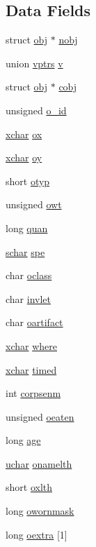 \subsection*{Data Fields}
\begin{DoxyCompactItemize}
\item 
struct \hyperlink{structobj}{obj} $\ast$ \hyperlink{structobj_ad1c5d790528ee1d8349ef302994789d8}{nobj}
\item 
union \hyperlink{unionvptrs}{vptrs} \hyperlink{structobj_a5ac1ba635501e7c9e4c37f2eec997920}{v}
\item 
struct \hyperlink{structobj}{obj} $\ast$ \hyperlink{structobj_aa7bed832c417657c964b6f5893737586}{cobj}
\item 
unsigned \hyperlink{structobj_a07e744e962a5f52bc93864a4bdd16840}{o\+\_\+id}
\item 
\hyperlink{global_8h_a2043b7d01ce89f4ee2fa6c345a752d32}{xchar} \hyperlink{structobj_aac936c7da6b4f1eca0a94f75c242e5cc}{ox}
\item 
\hyperlink{global_8h_a2043b7d01ce89f4ee2fa6c345a752d32}{xchar} \hyperlink{structobj_a72dace5e678b56ae42c3fb19292e5839}{oy}
\item 
short \hyperlink{structobj_a95eb282afebd3599996035e8aab71751}{otyp}
\item 
unsigned \hyperlink{structobj_a606b1d5b273b814049cc1b1991adfeec}{owt}
\item 
long \hyperlink{structobj_ad08c0ed1a746fbb52377ecd7e4220578}{quan}
\item 
\hyperlink{config_8h_a0fd9ce9d735064461bebfe6037026093}{schar} \hyperlink{structobj_a14fc8dc59e9073bfbf1e170875a98448}{spe}
\item 
char \hyperlink{structobj_a716ba3ee00602dede9ea5c68c74d45bd}{oclass}
\item 
char \hyperlink{structobj_a15d874124e5aacf167531decaca972b8}{invlet}
\item 
char \hyperlink{structobj_af03ce8a6a0ca51e8d8954fb1a1a31fbe}{oartifact}
\item 
\hyperlink{global_8h_a2043b7d01ce89f4ee2fa6c345a752d32}{xchar} \hyperlink{structobj_a57f24060a7aa1c3d2fd02c1c550cb5c6}{where}
\item 
\hyperlink{global_8h_a2043b7d01ce89f4ee2fa6c345a752d32}{xchar} \hyperlink{structobj_a1606b78f4b7e85536033e77348551f5f}{timed}
\item 
int \hyperlink{structobj_ad5db7220e2b815d06c3c80027ab9924f}{corpsenm}
\item 
unsigned \hyperlink{structobj_a51ce2f2a33e9c10a4698b75bd7d030c0}{oeaten}
\item 
long \hyperlink{structobj_a3dd6f7cf99f6a946d0ca406cfca5c23d}{age}
\item 
\hyperlink{config_8h_a65f85814a8290f9797005d3b28e7e5fc}{uchar} \hyperlink{structobj_a032663f21fa617948660e1102147b47d}{onamelth}
\item 
short \hyperlink{structobj_aff8be0ef151aed04ef0d41f39c90b9ef}{oxlth}
\item 
long \hyperlink{structobj_a7906e045755ba4099705764a4eb076c6}{owornmask}
\item 
long \hyperlink{structobj_aba8aff131c3bf3f9bc24949072de3cac}{oextra} \mbox{[}1\mbox{]}
\end{DoxyCompactItemize}


